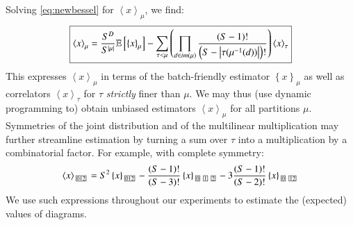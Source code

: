\documentclass{article}
\newcommand{\expct}[1]{\mathbb{E}\left[#1\right]}
\newcommand{\wrap}[1]{\left(#1\right)}
\newcommand{\wang}[1]{\left\langle#1\right\rangle}
\newcommand{\wabs}[1]{\left|#1\right|}
\newcommand{\wurl}[1]{\left\{#1\right\}}
\newcommand{\partbox}[1]{
    \text{
        \fboxsep=0.5pt
        \tiny
        \fbox{#1}
    }
}
\begin{document}
    Solving \ref{eq:newbessel} for $\wang{x}_\mu$, we find:
    \begin{equation*}
        \text{\fbox{$
        \wang{x}_\mu
        =
        \frac{S^D}{S^{\wabs{\mu}}}
        \expct{
            \wurl{x}_\mu
        }
        -
        \sum_{\tau < \mu} \wrap{
            \prod_{d\in im(\mu)}
            \frac{\wrap{S-1}!}{\wrap{S-\wabs{\tau(\mu^{-1}(d))}}!}
        }
        \wang{x}_\tau
        $}}
    \end{equation*}
    This expresses $\wang{x}_\mu$ in terms of the batch-friendly estimator
    $\wurl{x}_\mu$ as well as correlators $\wang{x}_\tau$ for $\tau$ 
    \emph{strictly} finer than $\mu$.  We may thus (use dynamic programming to)
    obtain unbiased estimators $\wang{x}_\mu$ for all partitions $\mu$. 
    Symmetries of the joint distribution and of the multilinear multiplication
    may further streamline estimation by turning a sum over $\tau$ into a
    multiplication by a combinatorial factor.  For example, with complete
    symmetry:
    $$
        \wang{x}_{\partbox{012}}
        =
        S^2
        \wurl{x}_{\partbox{012}}
        -
        \frac{(S-1)!}{(S-3)!}
        \wurl{x}_{\partbox{0}\partbox{1}\partbox{2}}
        -
        3\frac{(S-1)!}{(S-2)!}
        \wurl{x}_{\partbox{0}\partbox{12}}
    $$
    We use such expressions throughout our experiments to estimate the
    (expected) values of diagrams.
\end{document}
